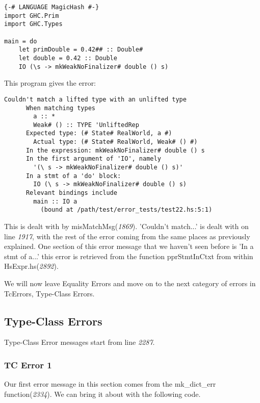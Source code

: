 \documentclass[a4paper]{article}
\begin{document}
\begin{lstlisting}[label={lst: T14.0}, numbers=none, caption={Example Program \cite{ex14}}]
{-# LANGUAGE MagicHash #-}
import GHC.Prim
import GHC.Types

main = do
    let primDouble = 0.42## :: Double#
    let double = 0.42 :: Double
    IO (\s -> mkWeakNoFinalizer# double () s)
\end{lstlisting}

This program gives the error:

\begin{lstlisting}[label={lst: T14.0.2}, numbers=none, caption={Error}]
 Couldn't match a lifted type with an unlifted type
      When matching types
        a :: *
        Weak# () :: TYPE 'UnliftedRep
      Expected type: (# State# RealWorld, a #)
        Actual type: (# State# RealWorld, Weak# () #)
      In the expression: mkWeakNoFinalizer# double () s
      In the first argument of 'IO', namely
        '(\ s -> mkWeakNoFinalizer# double () s)'
      In a stmt of a 'do' block:
        IO (\ s -> mkWeakNoFinalizer# double () s)
      Relevant bindings include
        main :: IO a
          (bound at /path/test/error_tests/test22.hs:5:1)
\end{lstlisting}

This is dealt with by misMatchMsg(\textit{1869}). 'Couldn't match...' is dealt with on line \textit{1917}, with the rest of the error coming from the same places as previously explained. One section of this error message that we haven't seen before is 'In a stmt of a...' this error is retrieved from the function pprStmtInCtxt from within HsExpr.hs(\textit{2892}).

We will now leave Equality Errors and move on to the next category of errors in TcErrors, Type-Class Errors.

\subsection{Type-Class Errors}

Type-Class Error messages start from line \textit{2287}. 

\subsubsection{TC Error 1}

Our first error message in this section comes from the mk\_dict\_err function(\textit{2334}). We can bring it about with the following code. 
\end{document}
